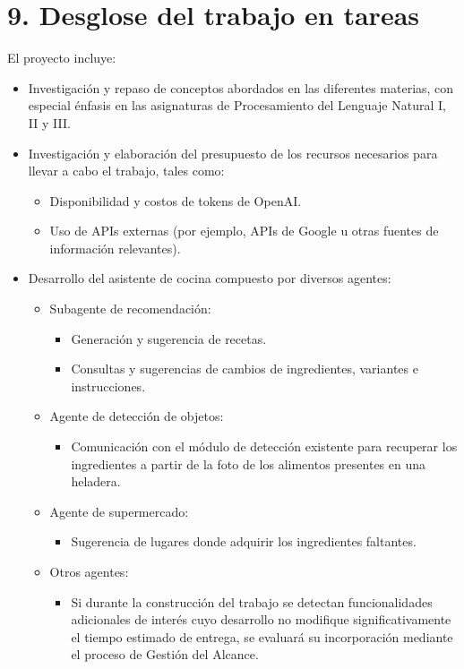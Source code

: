 \documentclass[
11pt, %
]{charter}
\begin{document}
\section{9. Desglose del trabajo en tareas}
\label{sec:wbs}

El proyecto incluye:
\begin{itemize}
    \item Investigación y repaso de conceptos abordados en las diferentes materias, con especial énfasis en las asignaturas de Procesamiento del Lenguaje Natural I, II y III.
    \item Investigación y elaboración del presupuesto de los recursos necesarios para llevar a cabo el trabajo, tales como:
    \begin{itemize}
        \item Disponibilidad y costos de tokens de OpenAI.
        \item Uso de APIs externas (por ejemplo, APIs de Google u otras fuentes de información relevantes).
    \end{itemize}
    \item Desarrollo del asistente de cocina compuesto por diversos agentes:
    \begin{itemize}
        \item Subagente de recomendación:
        \begin{itemize}
            \item Generación y sugerencia de recetas.
            \item Consultas y sugerencias de cambios de ingredientes, variantes e instrucciones.
        \end{itemize}
        \item Agente de detección de objetos:
        \begin{itemize}
            \item Comunicación con el módulo de detección existente para recuperar los ingredientes a partir de la foto de los alimentos presentes en una heladera.
        \end{itemize}
        \item Agente de supermercado:
        \begin{itemize}
            \item Sugerencia de lugares donde adquirir los ingredientes faltantes.
        \end{itemize}
        \item Otros agentes:
        \begin{itemize}
            \item Si durante la construcción del trabajo se detectan funcionalidades adicionales de interés cuyo desarrollo no modifique significativamente el tiempo estimado de entrega, se evaluará su incorporación mediante el proceso de Gestión del Alcance.

\end{itemize}
\end{itemize}
\end{itemize}
\end{document}
